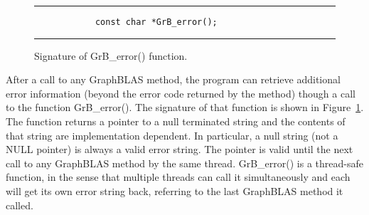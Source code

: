 \begin{figure}[tb]
	\hrule
	\vspace{1\baselineskip}
	\begin{center}
		\begin{minipage}{3in}
			\begin{verbatim}
			const char *GrB_error();
			\end{verbatim}
		\end{minipage}
	\end{center}
	\caption{Signature of {\sf GrB\_error()} function.}
	\label{Fig:GrB_error}
	\hrule
\end{figure}

After a call to any GraphBLAS method, the program can retrieve additional
error information (beyond the error code returned by the method) though a
call to the function {\sf GrB\_error()}. The signature of that function is
shown in Figure~\ref{Fig:GrB_error}.
The function returns a pointer to a null terminated string and the contents of that string
are implementation dependent. In particular, a null string (not a {\sf NULL} pointer) is always a valid error string.
The pointer is valid until the next call to any GraphBLAS method by the same thread.
{\sf GrB\_error()} is a thread-safe function, in the sense that multiple threads can
call it simultaneously and each will get its own error string back, referring to the
last GraphBLAS method it called.
